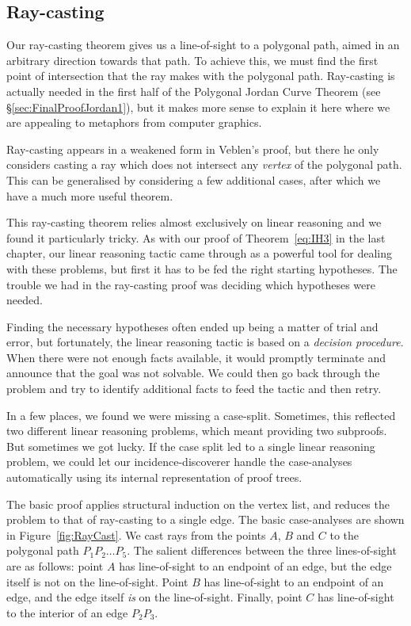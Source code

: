 \subsection{Ray-casting}\label{sec:RayCasting}
Our ray-casting theorem gives us a line-of-sight to a polygonal path, aimed in an arbitrary direction towards that path. To achieve this, we must find the first point of intersection that the ray makes with the polygonal path. Ray-casting is actually needed in the first half of the Polygonal Jordan Curve Theorem (see \S\ref{sec:FinalProofJordan1}), but it makes more sense to explain it here where we are appealing to metaphors from computer graphics.

Ray-casting appears in a weakened form in Veblen's proof, but there he only considers casting a ray which does not intersect any \emph{vertex} of the polygonal path. This can be generalised by considering a few additional cases, after which we have a much more useful theorem.

This ray-casting theorem relies almost exclusively on linear reasoning and we found it particularly tricky. As with our proof of Theorem~\ref{eq:IH3} in the last chapter, our linear reasoning tactic came through as a powerful tool for dealing with these problems, but first it has to be fed the right starting hypotheses. The trouble we had in the ray-casting proof was deciding which hypotheses were needed. 

Finding the necessary hypotheses often ended up being a matter of trial and error, but fortunately, the linear reasoning tactic is based on a \emph{decision procedure}. When there were not enough facts available, it would promptly terminate and announce that the goal was not solvable. We could then go back through the problem and try to identify additional facts to feed the tactic and then retry. 

In a few places, we found we were missing a case-split. Sometimes, this reflected two different linear reasoning problems, which meant providing two subproofs. But sometimes we got lucky. If the case split led to a single linear reasoning problem, we could let our incidence-discoverer handle the case-analyses automatically using its internal representation of proof trees.

The basic proof applies structural induction on the vertex list, and reduces the problem to that of ray-casting to a single edge. The basic case-analyses are shown in Figure~\ref{fig:RayCast}. We cast rays from the points $A$, $B$ and $C$ to the polygonal path $P_1P_2\ldots P_5$. The salient differences between the three lines-of-sight are as follows: point $A$ has line-of-sight to an endpoint of an edge, but the edge itself is not on the line-of-sight. Point $B$ has line-of-sight to an endpoint of an edge, and the edge itself \emph{is} on the line-of-sight. Finally, point $C$ has line-of-sight to the interior of an edge $P_2P_3$. 


